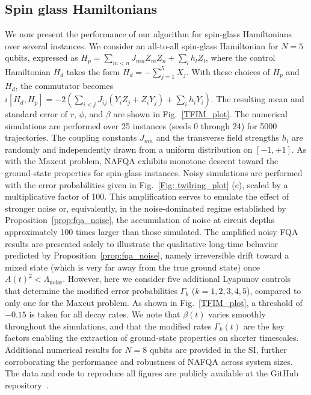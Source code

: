 \documentclass[10pt, superscriptaddress,aps,pra,twocolumn,showpacs,nofootinbib, longbibliography, notitlepage,floatfix]{revtex4-2}
\begin{document}
\subsection*{Spin glass Hamiltonians}
We now present the performance of our algorithm for spin-glass Hamiltonians over several instances. {We consider an all-to-all spin-glass Hamiltonian for $N = 5$ qubits, expressed as $H_p = \sum_{m<n}J_{mn}Z_m Z_n + \sum_l h_l Z_l$, where the control Hamiltonian $H_d$ takes the form $H_d = - \sum_{j = 1}^{5} X_j$. With these choices of $H_p$ and $H_d$, the commutator becomes $i[H_d,H_p] =  -2 \left(\sum_{i<j}J_{ij} (Y_i Z_j + Z_i Y_j) + \sum_{i} h_i Y_i \right)$. The resulting mean and standard error of $r$, $\phi$, and $\beta$ are shown in Fig.~\ref{TFIM_plot}. The numerical simulations are performed over 25 instances (seeds 0 through 24) for 5000 trajectories. The coupling constants $J_{mn}$ and the transverse field strengths $h_l$ are randomly and independently drawn from a uniform distribution on $[-1,+1]$. As with the Maxcut problem, NAFQA exhibits monotone descent toward the ground-state properties for spin-glass instances. Noisy simulations are performed with the error probabilities given in Fig.~\ref{Fig: twilring_plot} (c), scaled by a multiplicative factor of 100. This amplification serves to emulate the effect of stronger noise or, equivalently, in the noise-dominated regime established by Proposition~\ref{prop:fqa_noise}, the accumulation of noise at circuit depths approximately 100 times larger than those simulated. The amplified noisy FQA results are presented solely to illustrate the qualitative long-time behavior predicted by Proposition~\ref{prop:fqa_noise}, namely irreversible drift toward a mixed state (which is very far away from the true ground state) once $A(t)^2 < \Lambda_\mathrm{noise}$. However, here we consider five additional Lyapunov controls that determine the modified error probabilities $\Gamma_k$ ($k = 1,2,3,4,5$), compared to only one for the Maxcut problem. As shown in Fig.~\ref{TFIM_plot}, a threshold of $-0.15$ is taken for all decay rates. We note that $\beta(t)$ varies smoothly throughout the simulations, and that the modified rates $\Gamma_k(t)$ are the key factors enabling the extraction of ground-state properties on shorter timescales. Additional numerical results for $N = 8$ qubits are provided in the SI, further corroborating the performance and robustness of NAFQA across system sizes. The data and code to reproduce all figures are publicly available at the GitHub repository~\cite{nafqa_kasturi}.}
\end{document}
